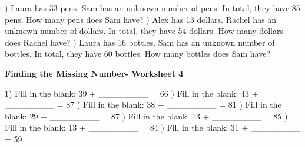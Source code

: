 \documentclass{article}%
\begin{document}
\newline%
\newline%
) Laura has 33 pens. Sam has an unknown number of pens. In total, they have 85 pens. How many pens does Sam have?%
\newline%
\newline%
) Alex has 13 dollars. Rachel has an unknown number of dollars. In total, they have 54 dollars. How many dollars does Rachel have?%
\newline%
\newline%
) Laura has 16 bottles. Sam has an unknown number of bottles. In total, they have 60 bottles. How many bottles does Sam have?%
\newline%
\newline%
\newline%
\pagebreak%
\large%
\begin{center}%
\textbf{Finding the Missing Number- Worksheet 4}%
\newline%
\newline%
\newline%
\end{center} \normalsize%
1) Fill in the blank: 39 + \_\_\_\_\_\_\_\_ = 66%
\newline%
\newline%
) Fill in the blank: 43 + \_\_\_\_\_\_\_\_ = 87%
\newline%
\newline%
) Fill in the blank: 38 + \_\_\_\_\_\_\_\_ = 81%
\newline%
\newline%
) Fill in the blank: 29 + \_\_\_\_\_\_\_\_ = 87%
\newline%
\newline%
) Fill in the blank: 13 + \_\_\_\_\_\_\_\_ = 85%
\newline%
\newline%
) Fill in the blank: 13 + \_\_\_\_\_\_\_\_ = 84%
\newline%
\newline%
) Fill in the blank: 31 + \_\_\_\_\_\_\_\_ = 59%
\newline%
\end{document}

